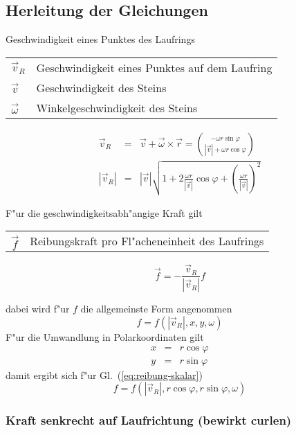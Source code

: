 \documentclass[a4paper]{report}
\newcommand{\eqlab}[1]{\label{eq:#1}}
\newcommand{\eqref}[1]{Gl.~(\ref{eq:#1})}
\newcommand{\vRo}{ \vec{v}   }   %
\newcommand{\vRi}{ \vec{v}_R }   %
\newcommand{\vRiAbsDivvRoCOS}[1]{\sqrt{\displaystyle
    1 + 2\frac{\omega #1}{|\vRo|}\cos\varphi +
    \left( \frac{\omega #1}{|\vRo|} \right)^2 } }
\begin{document}
\subsection{Herleitung der Gleichungen\label{herleitung}}

Geschwindigkeit eines Punktes des Laufrings

\begin{tabular}{@{}ll}
$ \vRi $	  & Geschwindigkeit eines Punktes auf dem Laufring \\
$ \vRo $	  & Geschwindigkeit des Steins \\
$ \vec{\omega} $  & Winkelgeschwindigkeit des Steins
\end{tabular}

\begin{eqnarray}
\vRi &=& \vRo + \vec{\omega} \times \vec{r} =
{-\omega r \sin\varphi \choose |\vRo| + \omega r \cos\varphi}
    \eqlab{speed-vektor}\\
|\vRi | &=& |\vRo| \vRiAbsDivvRoCOS{r}
    \eqlab{speed-skalar}
\end{eqnarray}

F"ur die geschwindigkeitsabh"angige Kraft gilt

\begin{tabular}{@{}ll}
$ \vec{f} $     & Reibungskraft pro Fl"acheneinheit des Laufrings
\end{tabular}

\begin{equation}
\vec{f} = - \frac{\vRi}{|\vRi|} f \eqlab{reibung-vektor}
\end{equation}

dabei wird f"ur $ f $ die allgemeinste Form angenommen
%
\begin{equation}
f = f(|\vRi|,x,y,\omega)    \eqlab{reibung-skalar}
\end{equation}
%
F"ur die Umwandlung in Polarkoordinaten gilt
%
\begin{eqnarray}
x &=& r \cos\varphi \\
y &=& r \sin\varphi
\end{eqnarray}
%
damit ergibt sich f"ur \eqref{reibung-skalar}
%
\begin{equation}
f = f(|\vRi|,r\cos\varphi,r\sin\varphi,\omega) \eqlab{reibung-polar}
\end{equation}

\subsubsection{Kraft senkrecht auf Laufrichtung (bewirkt curlen)}
\end{document}
